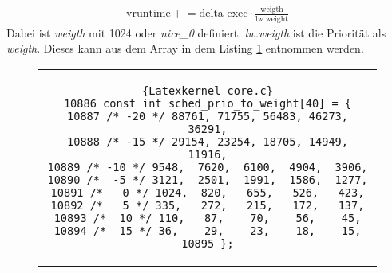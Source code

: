 \begin{align}
    \text{vruntime} \mathrel{+}= \text{delta\_exec} \cdot \frac{\text{weigth}}{\text{lw.weight}}
    \label{calc_vruntime}
\end{align}
Dabei ist \textit{weigth} mit 1024 oder \textit{nice\_0} definiert. \textit{lw.weigth} ist die Priorität als \textit{weigth}. Dieses kann aus dem Array in dem Listing \ref{core.c}\cite{LinuxKernel:Torvalds} entnommen werden.
\begin{figure}[h]
    \centering      
    \begin{tabular}{c}
        \begin{lstlisting}{Latexkernel core.c}
10886 const int sched_prio_to_weight[40] = {
10887 /* -20 */ 88761, 71755, 56483, 46273, 36291,
10888 /* -15 */ 29154, 23254, 18705, 14949, 11916,
10889 /* -10 */ 9548,  7620,  6100,  4904,  3906,
10890 /*  -5 */ 3121,  2501,  1991,  1586,  1277,
10891 /*   0 */ 1024,  820,   655,   526,   423,
10892 /*   5 */ 335,   272,   215,   172,   137,
10893 /*  10 */ 110,   87,    70,    56,    45,
10894 /*  15 */ 36,    29,    23,    18,    15,
10895 };
        \end{lstlisting}
    \end{tabular}
    \label{core.c}
\end{figure}
\newpage

